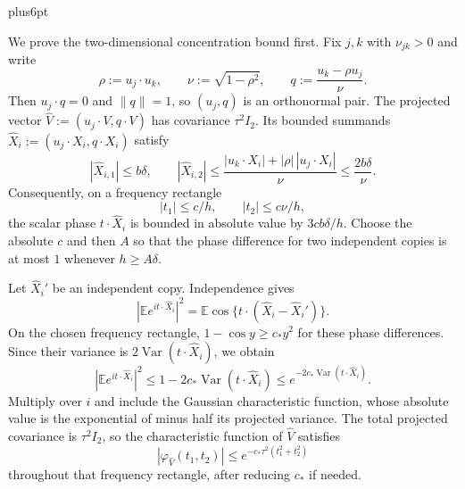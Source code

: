 \documentclass[11pt,letterpaper,twoside,leqno]{article}
\makeatletter
\theoremstyle{bookplain}
\theoremstyle{bookremark}
\renewenvironment{proof}[1][\proofname]{\par
  \pushQED{\qed}\normalfont\topsep6pt plus6pt\relax
  \trivlist\item[\hskip\labelsep\bfseries #1\@addpunct{.}]\ignorespaces
}{\popQED\endtrivlist\@endpefalse}
\newcommand{\E}{\mathbb E}
\newcommand{\Var}{\operatorname{Var}}
\makeatother
\begin{document}
\begin{proof}
We prove the two-dimensional concentration bound first. Fix
$j,k$ with $\nu_{jk}>0$ and write
\[
 \rho:=u_j\cdot u_k,\qquad \nu:=\sqrt{1-\rho^2},\qquad
 q:=\frac{u_k-\rho u_j}{\nu}.
\]
Then $u_j\cdot q=0$ and $\|q\|=1$, so $(u_j,q)$ is an
orthonormal pair. The projected vector
$\widehat V:=(u_j\cdot V,q\cdot V)$ has covariance
$\tau^2I_2$. Its bounded summands
$\widehat X_i:=(u_j\cdot X_i,q\cdot X_i)$ satisfy
\[
 |\widehat X_{i,1}|\le b\delta,
 \qquad
 |\widehat X_{i,2}|
 \le\frac{|u_k\cdot X_i|+|\rho|\,|u_j\cdot X_i|}{\nu}
 \le\frac{2b\delta}{\nu}.
\]
Consequently, on a frequency rectangle
\[
 |t_1|\le c/h,\qquad |t_2|\le c\nu/h,
\]
the scalar phase $t\cdot\widehat X_i$ is bounded in absolute
value by $3cb\delta/h$. Choose the absolute $c$ and then $A$
so that the phase difference for two independent copies is at
most $1$ whenever $h\ge A\delta$.

Let $\widehat X_i'$ be an independent copy. Independence gives
\[
 \left|\E e^{it\cdot\widehat X_i}\right|^2
 =\E\cos\{t\cdot(\widehat X_i-\widehat X_i')\}.
\]
On the chosen frequency rectangle, $1-\cos y\ge c_*y^2$
for these phase differences. Since their variance is
$2\Var(t\cdot\widehat X_i)$, we obtain
\[
 \left|\E e^{it\cdot\widehat X_i}\right|^2
 \le1-2c_*\Var(t\cdot\widehat X_i)
 \le e^{-2c_*\Var(t\cdot\widehat X_i)}.
\]
Multiply over $i$ and include the Gaussian characteristic
function, whose absolute value is the exponential of minus half
its projected variance. The total projected covariance is
$\tau^2I_2$, so the characteristic function of $\widehat V$
satisfies
\[
 |\varphi_{\widehat V}(t_1,t_2)|
 \le e^{-c_*\tau^2(t_1^2+t_2^2)}
\]
throughout that frequency rectangle, after reducing $c_*$ if needed.


\end{proof}
\end{document}
